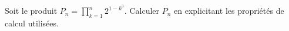%
%
	Soit le produit $P_n = \prod\limits_{k=1}^{n}2^{1-k^3}$. Calculer $P_n$ en explicitant les propriétés de calcul utilisées.
